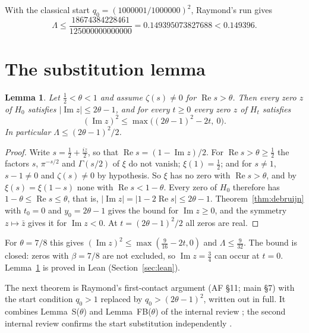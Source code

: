 \documentclass[11pt]{article}
\newtheorem{lemma}[theorem]{Lemma}
\theoremstyle{definition}
\newcommand{\LB}{\Lambda}
\DeclareMathOperator{\Rea}{Re}
\DeclareMathOperator{\Ima}{Im}
\begin{document}
With the classical start $q_0=(1000001/1000000)^2$, Raymond's run gives
\cite[Theorem~1]{Raymond26}
\[
\LB\le\frac{18674384228461}{125000000000000}=0.149395073827688<0.149396 .
\]

\section{The substitution lemma}\label{sec:subst}

\begin{lemma}\label{lem:subst}
Let $\frac12<\theta<1$ and assume $\zeta(s)\ne0$ for $\Rea s>\theta$. Then every zero $z$ of
$H_0$ satisfies $|\Ima z|\le2\theta-1$, and for every $t\ge0$ every zero $z$ of $H_t$
satisfies
\[
(\Ima z)^2\le\max\bigl((2\theta-1)^2-2t,\ 0\bigr).
\]
In particular $\LB\le(2\theta-1)^2/2$.
\end{lemma}

\begin{proof}
Write $s=\frac12+\frac{iz}2$, so that $\Rea s=(1-\Ima z)/2$. For $\Rea s>\theta\ge\frac12$
the factors $s$, $\pi^{-s/2}$ and $\Gamma(s/2)$ of $\xi$ do not vanish; $\xi(1)=\frac12$;
and for $s\ne1$, $s-1\ne0$ and $\zeta(s)\ne0$ by hypothesis. So $\xi$ has no zero with
$\Rea s>\theta$, and by $\xi(s)=\xi(1-s)$ none with $\Rea s<1-\theta$. Every zero of $H_0$
therefore has $1-\theta\le\Rea s\le\theta$, that is,
$|\Ima z|=|1-2\Rea s|\le2\theta-1$. Theorem~\ref{thm:debruijn} with $t_0=0$ and
$y_0=2\theta-1$ gives the bound for $\Ima z\ge0$, and the symmetry $z\mapsto\bar z$ gives
it for $\Ima z<0$. At $t=(2\theta-1)^2/2$ all zeros are real.
\end{proof}

For $\theta=7/8$ this gives $(\Ima z)^2\le\max(\frac9{16}-2t,0)$ and $\LB\le\frac9{32}$. The bound is
closed: zeros with $\beta=7/8$ are not excluded, so $\Ima z=\frac34$ can occur at $t=0$.
Lemma~\ref{lem:subst} is proved in Lean (Section~\ref{sec:lean}).

The next theorem is Raymond's first-contact argument (AF \S11; main \S7) with the start
condition $q_0>1$ replaced by $q_0>(2\theta-1)^2$, written out in full. It combines
Lemma~S($\theta$) and Lemma~FB($\theta$) of the internal review \cite[\S\S5,
8]{IntReviewB}; the second internal review confirms the start substitution
independently \cite[\S7]{IntReviewA}.
\end{document}
